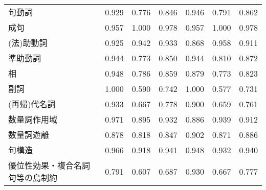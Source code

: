 \begin{table}[H]
\begin{tabular}{lcccccc}
    句動詞 & 0.929 & 0.776 & 0.846 & 0.946 & 0.791 & 0.862 \\
    成句 & 0.957 & 1.000 & 0.978 & 0.957 & 1.000 & 0.978 \\
    (法)助動詞 & 0.925 & 0.942 & 0.933 & 0.868 & 0.958 & 0.911 \\
    準助動詞 & 0.944 & 0.773 & 0.850 & 0.944 & 0.810 & 0.872 \\
    相 & 0.948 & 0.786 & 0.859 & 0.879 & 0.773 & 0.823 \\
    副詞 & 1.000 & 0.590 & 0.742 & 1.000 & 0.577 & 0.731 \\
    (再帰)代名詞 & 0.933 & 0.667 & 0.778 & 0.900 & 0.659 & 0.761 \\
    数量詞作用域 & 0.971 & 0.895 & 0.932 & 0.886 & 0.939 & 0.912 \\
    数量詞遊離 & 0.878 & 0.818 & 0.847 & 0.902 & 0.871 & 0.886 \\
    句構造 & 0.966 & 0.918 & 0.941 & 0.948 & 0.932 & 0.940 \\
    優位性効果・複合名詞句等の島制約 & 0.791 & 0.607 & 0.687 & 0.930 & 0.667 & 0.777 \\
    \hline
    \end{tabular}
\end{table}
